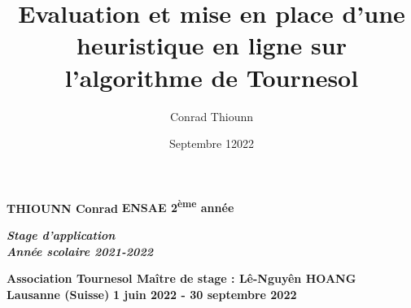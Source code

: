 \documentclass[hidelinks, 12pt]{article}
\title{Evaluation et mise en place d'une heuristique en ligne sur l'algorithme de Tournesol }
\author{
Conrad Thiounn }
\date{Septembre 12022}
\begin{document}
%
%
%

\begin{titlingpage}
\noindent
\textbf{\Large{THIOUNN Conrad}} \hfill
\textbf{\Large{ENSAE 2\textsuperscript{ème} année}} 
\begin{flushright}
\begin{minipage}{5.4cm}
\begin{center}
\textbf{\emph{\large{Stage d'application \\
Année scolaire 2021-2022 }}} 
\end{center}
\end{minipage}
\end{flushright}

\vspace{8cm}

\hspace*{-\parindent}%

\vspace{8cm}

\noindent \textbf{\Large{Association Tournesol \hfill Maître de stage : Lê-Nguyên HOANG \\ 
\hspace{20mm} Lausanne (Suisse)}} \hfill \textbf{\large{1 juin 2022 - 30 septembre 2022}}

\end{titlingpage}



\renewcommand*\contentsname{Table des matières}
\tableofcontents

\setlength\parskip{0.2 em} %
\end{document}
